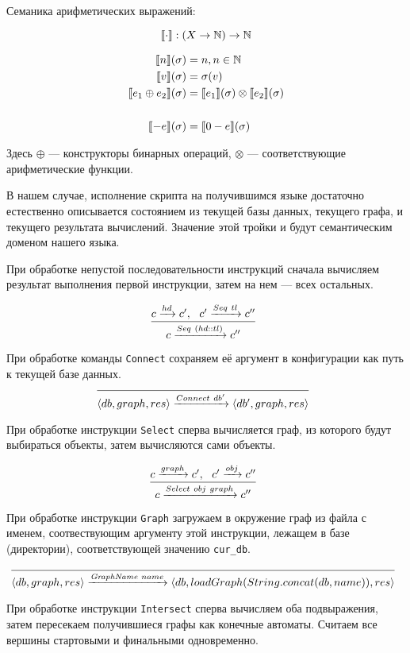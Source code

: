 Семаника арифметических выражений:

$$\llbracket \cdot \rrbracket : (X \rightarrow \mathbb{N}) \rightarrow \mathbb{N}$$


\begin{align*}
  \llbracket n \rrbracket(\sigma) &= n, n \in \mathbb{N} \\
  \llbracket v \rrbracket(\sigma) &= \sigma(v) \\
  \llbracket e_1 \oplus e_2 \rrbracket(\sigma) &= \llbracket e_1 \rrbracket(\sigma) \otimes \llbracket e_2 \rrbracket(\sigma) \\
  & \\
  \llbracket -e \rrbracket(\sigma) &= \llbracket 0-e \rrbracket(\sigma)
\end{align*}

Здесь $\oplus$ --- конструкторы бинарных операций, $\otimes$ --- соответствующие арифметические функции.

В нашем случае, исполнение скрипта на получившимся языке достаточно естественно описывается состоянием из текущей базы данных, текущего графа, и текущего результата вычислений. Значение этой тройки и будут семантическим доменом нашего языка.

При обработке непустой последовательности инструкций сначала вычисляем результат выполнения первой инструкции, затем на нем --- всех остальных.

$$
\infer[]{c \xrightarrow{Seq \ (hd::tl)} c''}{c \xrightarrow{hd} c', \ \ c' \xrightarrow{Seq \ tl} c''}
$$

При обработке команды \verb|Connect| сохраняем её аргумент в конфигурации как путь к текущей базе данных.
$$
\infer[]{\langle db, graph, res\rangle \xrightarrow{Connect \ db'} \langle db', graph, res\rangle}{}
$$

При обработке инструкции \verb|Select| сперва вычисляется граф, из которого будут выбираться объекты, затем вычисляются сами объекты.

$$
\infer[]{c \xrightarrow{Select \ obj \ graph} c''}{c \xrightarrow{graph} c', \ \ c' \xrightarrow{obj} c''}
$$

При обработке инструкции \verb|Graph| загружаем в окружение граф из файла с именем, соотвествующим аргументу этой инструкции, лежащем в базе (директории), соответствующей значению \verb|cur_db|.

$$
\infer[]{\langle db, graph, res \rangle \xrightarrow{\textit{GraphName} \ name} \langle db ,loadGraph(String.concat(db,name)), res\rangle}{}
$$

При обработке инструкции \verb|Intersect| сперва вычисляем оба подвыражения, затем пересекаем получившиеся графы как конечные автоматы. Считаем все вершины стартовыми и финальными одновременно.

